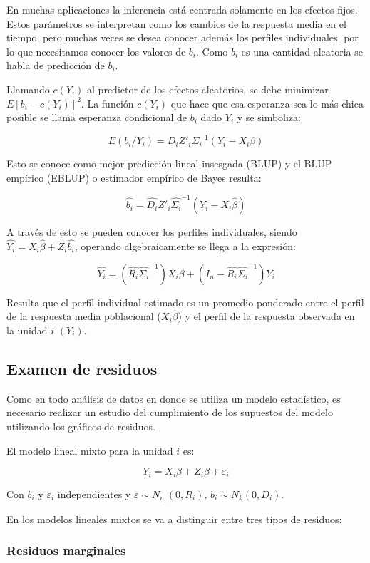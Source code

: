 \documentclass[spanish]{article}
\numberwithin{figure}{subsection}
\numberwithin{equation}{subsection}
\numberwithin{table}{subsection}
\begin{document}
En muchas aplicaciones la inferencia está centrada solamente en los efectos fijos. Estos parámetros se interpretan como
los cambios de la respuesta media en el tiempo, pero muchas veces se desea conocer además los perfiles individuales, por
lo que necesitamos conocer los valores de $b_i$. Como $b_i$ es una cantidad aleatoria se habla de predicción de $b_i$.

Llamando $c(Y_i)$ al predictor de los efectos aleatorios, se debe minimizar $E[b_i - c(Y_i)]^2$. La función $c(Y_i)$
que hace que esa esperanza sea lo más chica posible se llama esperanza condicional de $b_i$ dado $Y_i$ y se simboliza:

\[ E(b_i/Y_i) = D_iZ'_i\varSigma_i^{-1} (Y_i - X_i\beta) \]

Esto se conoce como mejor predicción lineal insesgada (BLUP) y el BLUP empírico (EBLUP) o estimador empírico de Bayes
resulta:

\[ \hat{b_i} = \hat{D_i}Z'_i\hat{\varSigma_i}^{-1} (Y_i - X_i\hat{\beta}) \]

A través de esto se pueden conocer los perfiles individuales, siendo $\hat{Y_i} = X_i\hat{\beta} + Z_i\hat{b_i}$,
operando algebraicamente se llega a la expresión:

\[ \hat{Y_i} = (\hat{R_i}\hat{\varSigma_i}^{-1}) X_i\beta + (I_n - \hat{R_i}\hat{\varSigma_i}^{-1}) Y_i \]

Resulta que el perfil individual estimado es un promedio ponderado entre el perfil de la respuesta media poblacional
($X_i\hat{\beta}$) y el perfil de la respuesta observada en la unidad $i$ $(Y_i)$.

\subsection{Examen de residuos}

Como en todo análisis de datos en donde se utiliza un modelo estadístico, es necesario realizar un estudio del
cumplimiento de los supuestos del modelo utilizando los gráficos de residuos.

El modelo lineal mixto para la unidad $i$ es:

\[ Y_i = X_i\beta + Z_i\beta + \varepsilon_i \]

Con $b_i$ y $\varepsilon_i$ independientes y $\varepsilon \sim N_{n_i}(0, R_i)$, $b_i \sim N_k(0, D_i)$.

En los modelos lineales mixtos se va a distinguir entre tres tipos de residuos:

\subsubsection{Residuos marginales}
\end{document}
